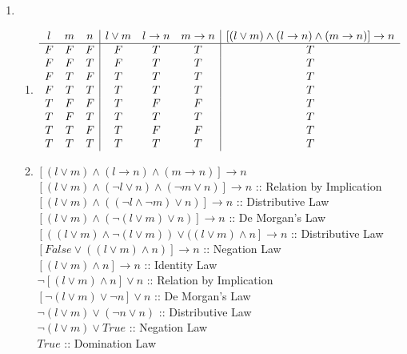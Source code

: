\documentclass[11pt]{amsart}
\begin{document}
	\begin{sol}
		\begin{enumerate}
			\item
			\begin{enumerate}
				\item
				\begin{displaymath}
				\begin{array}{c c c|c c c|c}
					l & m & n & l \vee m & l \rightarrow n & m \rightarrow n & \left[ (l \vee  m) \wedge (l \rightarrow n) \wedge (m \rightarrow n)\right]  \rightarrow n\\
					\hline
					F & F & F & F & T & T & T\\
					F & F & T & F & T & T & T\\
					F & T & F & T & T & T & T\\
					F & T & T & T & T & T & T\\
					T & F & F & T & F & F & T\\
					T & F & T & T & T & T & T\\
					T & T & F & T & F & F & T\\
					T & T & T & T & T & T & T\\
				\end{array}
				\end{displaymath}
				\item 
				$\left[ (l \vee  m) \wedge (l \rightarrow n) \wedge (m \rightarrow n)\right]  \rightarrow n $\\
				$\left[ (l \vee  m) \wedge (\neg l \vee n) \wedge (\neg m \vee n)\right]  \rightarrow n $ :: Relation by Implication\\
				$\left[ (l \vee  m) \wedge ((\neg l \wedge \neg m) \vee n)\right]  \rightarrow n $ :: Distributive Law\\
				$\left[ (l \vee  m) \wedge (\neg(l \vee m) \vee n)\right]  \rightarrow n $ :: De Morgan's Law\\
				$\left[((l \vee m) \wedge \neg(l \vee m)) \vee ((l \vee m) \wedge n \right]  \rightarrow n $ :: Distributive Law\\
				$\left[ False \vee ((l \vee m) \wedge n) \right] \rightarrow n $ :: Negation Law\\
				$\left[(l \vee m) \wedge n \right] \rightarrow n$ :: Identity Law\\
				$\neg \left[(l \vee m) \wedge n \right] \vee n$ :: Relation by Implication\\
				$\left[\neg(l \vee m) \vee \neg n \right] \vee n$ :: De Morgan's Law\\
				$\neg(l \vee m) \vee (\neg n \vee n)$ :: Distributive Law\\
				$\neg(l \vee m) \vee True$ :: Negation Law\\
				$True$ :: Domination Law


\end{enumerate}
\end{enumerate}
\end{sol}
\end{document}
